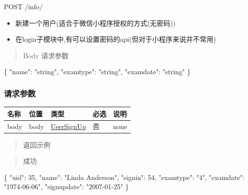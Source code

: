 \documentclass[
]{article}
\newenvironment{Shaded}{}{}
\newcommand{\DataTypeTok}[1]{\textcolor[rgb]{0.56,0.13,0.00}{#1}}
\newcommand{\DecValTok}[1]{\textcolor[rgb]{0.25,0.63,0.44}{#1}}
\newcommand{\FunctionTok}[1]{\textcolor[rgb]{0.02,0.16,0.49}{#1}}
\newcommand{\StringTok}[1]{\textcolor[rgb]{0.25,0.44,0.63}{#1}}
\begin{document}
POST /info/

\begin{itemize}
\item
  新建一个用户(适合于微信小程序授权的方式(无密码))
\item
  在login子模块中,有可以设置密码的api(但对于小程序来说并不常用)
\end{itemize}

\begin{quote}
Body 请求参数
\end{quote}

\begin{Shaded}
\begin{Highlighting}[]
\FunctionTok{\{}
  \DataTypeTok{"name"}\FunctionTok{:} \StringTok{"string"}\FunctionTok{,}
  \DataTypeTok{"examtype"}\FunctionTok{:} \StringTok{"string"}\FunctionTok{,}
  \DataTypeTok{"examdate"}\FunctionTok{:} \StringTok{"string"}
\FunctionTok{\}}
\end{Highlighting}
\end{Shaded}

\hypertarget{ux8bf7ux6c42ux53c2ux6570-24}{%
\subsubsection{请求参数}\label{ux8bf7ux6c42ux53c2ux6570-24}}

\begin{longtable}[]{@{}lllll@{}}
\toprule
名称 & 位置 & 类型 & 必选 & 说明 \\
\midrule
\endhead
body & body & \protect\hyperlink{schemausersignup}{UserSignUp} & 否 &
none \\
\bottomrule
\end{longtable}

\begin{quote}
返回示例
\end{quote}

\begin{quote}
成功
\end{quote}

\begin{Shaded}
\begin{Highlighting}[]
\FunctionTok{\{}
  \DataTypeTok{"uid"}\FunctionTok{:} \DecValTok{35}\FunctionTok{,}
  \DataTypeTok{"name"}\FunctionTok{:} \StringTok{"Linda Anderson"}\FunctionTok{,}
  \DataTypeTok{"signin"}\FunctionTok{:} \DecValTok{54}\FunctionTok{,}
  \DataTypeTok{"examtype"}\FunctionTok{:} \StringTok{"4"}\FunctionTok{,}
  \DataTypeTok{"examdate"}\FunctionTok{:} \StringTok{"1974{-}06{-}06"}\FunctionTok{,}
  \DataTypeTok{"signupdate"}\FunctionTok{:} \StringTok{"2007{-}01{-}25"}
\FunctionTok{\}}
\end{Highlighting}
\end{Shaded}
\end{document}
